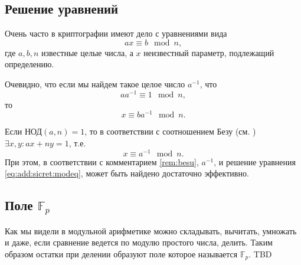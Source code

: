 \subsection{Решение уравнений}
\label{sec:add:discretmath:mod:equationsolve}
Очень часто в криптографии имеют дело с уравнениями вида
\begin{equation}
a x \equiv b \mod n,
\label{eq:add:sicret:modeq}
\end{equation}
где $a, b, n$ известные целые числа, а $x$ неизвестный параметр,
подлежащий определению.

Очевидно, что если мы найдем такое целое число $a^{-1}$, что 
\[
a a^{-1} \equiv 1 \mod n,
\]
то
\[
x \equiv b a^{-1} \mod n.
\]

Если $\mbox{НОД}\left(a, n\right) = 1$, то в соответствии с
соотношением Безу (см. ) 
$\exists x, y: a x + n y = 1$, т.е. 
\[
x \equiv a^{-1} \mod n.
\]
При этом, в соответствии с комментарием \ref{rem:besu}, $a^{-1}$, и
решение уравнения \eqref{eq:add:sicret:modeq}, может быть найдено
достаточно эффективно.

\subsection{Поле $\mathbb{F}_p$}
\label{sec:add:diskretmath:mod:fp}
Как мы видели в модульной арифметике можно складывать, вычитать,
умножать и даже, если сравнение ведется по модулю простого числа,
делить. Таким образом остатки при делении образуют поле которое
называется $\mathbb{F}_p$.
TBD
